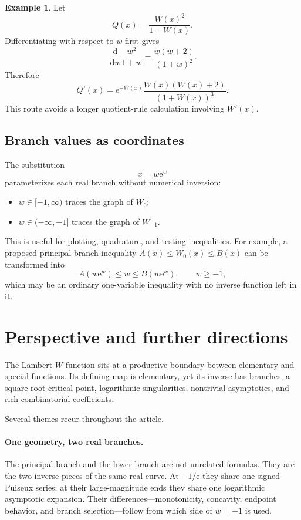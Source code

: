 \documentclass[11pt]{article}
\numberwithin{equation}{section}
\theoremstyle{definition}
\newtheorem{example}[theorem]{Example}
\theoremstyle{remark}
\newcommand{\e}{\mathrm e}
\newcommand{\dd}{\,\mathrm d}
\begin{document}
\begin{example}
Let
\[
  Q(x)=\frac{W(x)^2}{1+W(x)}.
\]
Differentiating with respect to $w$ first gives
\[
  \frac{\dd}{\dd w}\frac{w^2}{1+w}
  =\frac{w(w+2)}{(1+w)^2}.
\]
Therefore
\[
 Q'(x)=\e^{-W(x)}\frac{W(x)(W(x)+2)}{(1+W(x))^3}.
\]
This route avoids a longer quotient-rule calculation involving $W'(x)$.
\end{example}

\subsection{Branch values as coordinates}

The substitution
\begin{equation}
  x=w\e^w                                             \label{eq:w-coordinate}
\end{equation}
parameterizes each real branch without numerical inversion:
\begin{itemize}
\item $w\in[-1,\infty)$ traces the graph of $W_0$;
\item $w\in(-\infty,-1]$ traces the graph of $W_{-1}$.
\end{itemize}
This is useful for plotting, quadrature, and testing inequalities.  For
example, a proposed principal-branch inequality
$A(x)\le W_0(x)\le B(x)$ can be transformed into
\[
 A(w\e^w)\le w\le B(w\e^w),\qquad w\ge-1,
\]
which may be an ordinary one-variable inequality with no inverse function
left in it.

\section{Perspective and further directions}
\label{sec:perspective}

The Lambert $W$ function sits at a productive boundary between elementary and
special functions.  Its defining map is elementary, yet its inverse has
branches, a square-root critical point, logarithmic singularities, nontrivial
asymptotics, and rich combinatorial coefficients.

Several themes recur throughout the article.

\paragraph{One geometry, two real branches.}
The principal branch and the lower branch are not unrelated formulas.  They
are the two inverse pieces of the same real curve.  At $-1/\e$ they share one
signed Puiseux series; at their large-magnitude ends they share one logarithmic
asymptotic expansion.  Their differences---monotonicity, concavity, endpoint
behavior, and branch selection---follow from which side of $w=-1$ is used.
\end{document}
